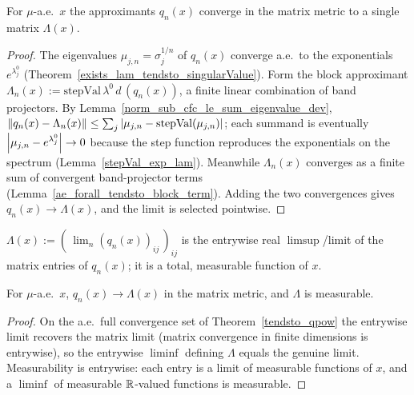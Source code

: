 \begin{theorem}\label{tendsto_qpow}
  \leanok
  For \(\mu\)-a.e.\ \(x\) the approximants \(q_n(x)\) converge in the matrix metric to a single
  matrix \(\Lambda(x)\).
\end{theorem}
\begin{proof}\leanok
  The eigenvalues \(\mu_{j,n}=\sigma_j^{1/n}\) of \(q_n(x)\) converge a.e.\ to the exponentials
  \(e^{\lambda^0_j}\) (Theorem~\ref{exists_lam_tendsto_singularValue}). Form the block approximant
  \(\Lambda_n(x) := \mathrm{stepVal}\,\lambda^0\,d\,(q_n(x))\), a finite linear combination of band
  projectors. By Lemma~\ref{norm_sub_cfc_le_sum_eigenvalue_dev},
  \(\left\lVert q_n(x)-\Lambda_n(x) \right\rVert\le\sum_j\left\lvert \mu_{j,n}-\mathrm{stepVal}(\mu_{j,n}) \right\rvert\); each summand
  is eventually \(\left\lvert \mu_{j,n}-e^{\lambda^0_j} \right\rvert\to 0\) because the step function reproduces the
  exponentials on the spectrum (Lemma~\ref{stepVal_exp_lam}). Meanwhile \(\Lambda_n(x)\) converges
  as a finite sum of convergent band-projector terms
  (Lemma~\ref{ae_forall_tendsto_block_term}). Adding the two convergences gives
  \(q_n(x)\to\Lambda(x)\), and the limit is selected pointwise.
\end{proof}

\begin{definition}\label{oseledetsLimit}
  \leanok
  \(\Lambda(x) := (\,\lim_n (q_n(x))_{ij}\,)_{ij}\) is the entrywise real \(\limsup\)/limit of the
  matrix entries of \(q_n(x)\); it is a total, measurable function of \(x\).
\end{definition}

\begin{theorem}\label{tendsto_oseledetsLimit}
  \leanok
  For \(\mu\)-a.e.\ \(x\), \(q_n(x)\to \Lambda(x)\) in the matrix metric, and \(\Lambda\) is
  measurable.
\end{theorem}
\begin{proof}\leanok
  On the a.e.\ full convergence set of Theorem~\ref{tendsto_qpow} the entrywise limit recovers the
  matrix limit (matrix convergence in finite dimensions is entrywise), so the entrywise
  \(\liminf\) defining \(\Lambda\) equals the genuine limit. Measurability is entrywise: each
  entry is a limit of measurable functions of \(x\), and a \(\liminf\) of measurable
  \(\mathbb{R}\)-valued functions is measurable.
\end{proof}

